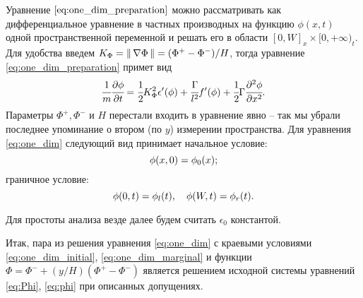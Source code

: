Уравнение $\eqref{eq:one_dim_preparation}$ можно рассматривать как дифференциальное уравнение в частных производных на функцию $\phi(x, t)$ одной пространственной переменной и решать его в области $[0, W]_x \times [0, +\infty)_t$. Для удобства введем $K_\Phi \hm = \norm{\nabla \Phi} = (\Phi^+ - \Phi^-) / H$, тогда уравнение \eqref{eq:one_dim_preparation} примет вид
\begin{equation}
	\cfrac{1}{m} \cfrac{\partial \phi}{\partial t} = \cfrac{1}{2} K_\Phi^2 \epsilon'(\phi) + \cfrac{\Gamma}{l^2} f'(\phi) + \cfrac{1}{2} \Gamma \cfrac{\partial^2 \phi}{\partial x^2} {\text{.}}
	\label{eq:one_dim}
\end{equation}
Параметры $\Phi^+, \Phi^-$ и $H$ перестали входить в уравнение явно -- так мы убрали последнее упоминание о втором (по $y$) измерении пространства. Для уравнения \eqref{eq:one_dim} следующий вид принимает начальное условие:
\begin{equation}
	\phi(x, 0) = \phi_0(x) {\text{;}}
	\label{eq:one_dim_initial}
\end{equation}
граничное условие:
\begin{equation}
	\phi(0, t) = \phi_l(t), \quad \phi(W, t) = \phi_r(t) {\text{.}}
	\label{eq:one_dim_marginal}
\end{equation}

Для простоты анализа везде далее будем считать $\epsilon_0$ константой.

Итак, пара из решения уравнения \eqref{eq:one_dim} с краевыми условиями \eqref{eq:one_dim_initial}, \eqref{eq:one_dim_marginal} и функции $\Phi = \Phi^- + (y / H)(\Phi^+ - \Phi^-)$ является решением исходной системы уравнений \eqref{eq:Phi}, \eqref{eq:phi} при описанных допущениях.